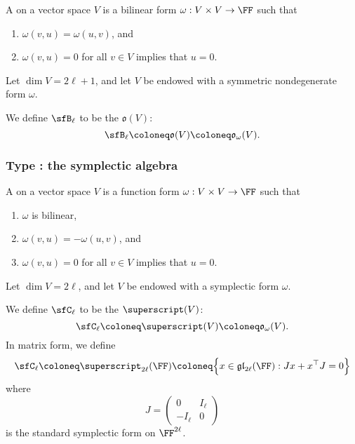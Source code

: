 \documentclass{article}
\newcommand*\gl{\ensuremath{\mathfrak{gl}}}
\let\sp\superscript
\newcommand*\sp{\ensuremath{\mathfrak{sp}}}
\newcommand*\oalg{\ensuremath{\mathfrak{o}}}
\begin{document}
\begin{definition}
    A  on a vector space $V$ is a bilinear form $\omega: V \times V \to \FF$ such that
    \begin{enumerate}[label=(\alph*)]
        \item 
            $\omega(v,u) = \omega(u,v)$, and
        \item 
            $\omega(v,u) = 0$ for all $v \in V$ implies that $u=0$.
    \end{enumerate}
\end{definition}

\begin{definition}
    Let $\dim V = 2\ell+1$, and let $V$ be endowed with a symmetric nondegenerate form $\omega$.

    We define $\sfB_\ell$ to be the  $\oalg(V)$:
    \[
        \sfB_\ell
        \coloneq
        \oalg(V)
        \coloneq
        \oalg_\omega(V).
    \]
\end{definition}

\subsubsection{Type \sfC: the symplectic algebra}

\begin{definition}
    A  on a vector space $V$ is a function form $\omega: V \times V \to \FF$ such that
    \begin{enumerate}[label=(\alph*)]
        \item
            $\omega$ is bilinear,
        \item 
            $\omega(v,u) = -\omega(u,v)$, and
        \item 
            $\omega(v,u) = 0$ for all $v \in V$ implies that $u=0$.
    \end{enumerate}
\end{definition}

\begin{definition}
    Let $\dim V = 2\ell$, and let $V$ be endowed with a symplectic form $\omega$.

    We define $\sfC_\ell$ to be the  $\sp(V)$:
    \[
        \sfC_\ell
        \coloneq
        \sp(V)
        \coloneq
        \oalg_\omega(V).
    \]
    In matrix form, we define
    \[
        \sfC_\ell
        \coloneq
        \sp_{2\ell}(\FF)
        \coloneq
        \Big\{
            x \in \gl_{2\ell}(\FF)
            :
            Jx + x^\top J = 0
        \Big\}
    \]
    where
    \[
        J
        =
        \begin{pmatrix}
            0 & I_\ell \\
            -I_\ell & 0
        \end{pmatrix}
    \]
    is the standard symplectic form on $\FF^{2\ell}$.
\end{definition}
\end{document}
